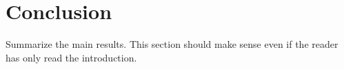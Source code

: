 \chapter{Conclusion}

Summarize the main results. This section should make sense even if the reader has only read
the introduction.


